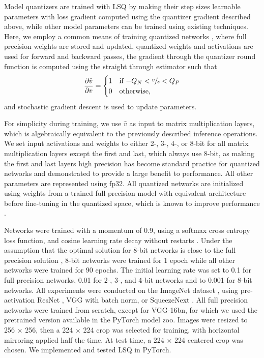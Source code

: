 \documentclass{article}
\begin{document}
Model quantizers are trained with LSQ by making their step sizes learnable parameters with loss gradient computed using the quantizer gradient described above, while other model parameters can be trained using existing techniques.
Here, we employ a common means of training quantized networks \citep{courbariaux2015binaryconnect},
where full precision weights are stored and updated, quantized weights and activations are used for forward and backward passes, the gradient through the quantizer round function is computed using the straight through estimator \citep{bengio2013estimating} such that
\begin{equation}\label{eq:xgrad}
	\frac{\partial \hat{v}}{\partial v} = 
	\begin{cases}
		1 & \text{if $-Q_N < \sfrac{v}{s} < Q_P$} \\
		0 & \text{otherwise},
	\end{cases}
\end{equation}
and stochastic gradient descent is used to update parameters.


For simplicity during training, we use $\hat{v}$ as input to matrix multiplication layers, which is algebraically equivalent to the previously described inference operations.
We set input activations and weights to either 2-, 3-, 4-, or 8-bit for all matrix multiplication layers except the first and last, which always use 8-bit, as making the first and last layers high precision has become standard practice for quantized networks and demonstrated to provide a large benefit to performance.  All other parameters are represented using fp32.
All quantized networks are initialized using weights from a trained full precision model with equivalent architecture before fine-tuning in the quantized space, which is known to improve performance \citep{sung2015resiliency,zhou2016dorefa,mishra2017apprentice,mckinstry2018discovering}.



Networks were trained with a momentum of 0.9, using a softmax cross entropy loss function, and cosine learning rate decay without restarts \citep{DBLP:journals/corr/LoshchilovH16a}.
Under the assumption that the optimal solution for 8-bit networks is close to the full precision solution \citep{mckinstry2018discovering}, 8-bit networks were trained for 1 epoch while all other networks were trained for 90 epochs.
The initial learning rate was set to 0.1 for full precision networks, 0.01 for 2-, 3-, and 4-bit networks and to 0.001 for 8-bit networks.
All experiments were conducted on the ImageNet dataset \citep{russakovsky2015imagenet}, using pre-activation ResNet \citep{he2016deep}, VGG \citep{simonyan2014very} with batch norm, or SqueezeNext \citep{gholami2018squeezenext}.
All full precision networks were trained from scratch, except for VGG-16bn, for which we used the pretrained version available in the PyTorch model zoo.
Images were resized to 256 $\times$ 256, then a 224 $\times$ 224 crop was selected for training, with horizontal mirroring applied half the time.  At test time, a 224 $\times$ 224 centered crop was chosen.
We implemented and tested LSQ in PyTorch.
\end{document}
